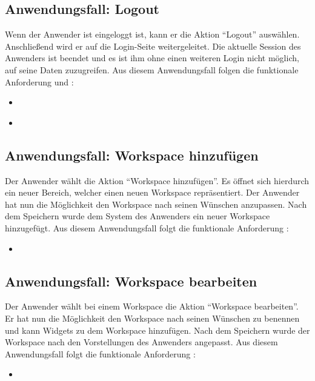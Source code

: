 \subsection{Anwendungsfall: Logout}
Wenn der Anwender ist eingeloggt ist, kann er die Aktion "`Logout"' auswählen. Anschließend wird er auf die Login-Seite weitergeleitet. Die aktuelle Session des Anwenders ist beendet und es ist ihm ohne einen weiteren Login nicht möglich, auf seine Daten zuzugreifen. Aus diesem Anwendungsfall folgen die funktionale Anforderung  und :
\begin{itemize}
 \item \requirementf{\requirementLogout}\label{requirementLogout}
 \item \requirementf{\requirementKeinZugriffNachLogout}\label{requirementKeinZugriffNachLogout}
\end{itemize}

\subsection{Anwendungsfall: Workspace hinzufügen}
Der Anwender wählt die Aktion "`Workspace hinzufügen"'. Es öffnet sich hierdurch ein neuer Bereich, welcher einen neuen Workspace repräsentiert. Der Anwender hat nun die Möglichkeit den Workspace nach seinen Wünschen anzupassen. Nach dem Speichern wurde dem System des Anwenders ein neuer Workspace hinzugefügt. Aus diesem Anwendungsfall folgt die funktionale Anforderung :
\begin{itemize}
 \item \requirementf{\requirementWorkspaceAdd}\label{requirementWorkspaceAdd}
\end{itemize}
 
\subsection{Anwendungsfall: Workspace bearbeiten}
Der Anwender wählt bei einem Workspace die Aktion "`Workspace bearbeiten"'. Er hat nun die Möglichkeit den Workspace nach seinen Wünschen zu benennen und kann Widgets zu dem Workspace hinzufügen. Nach dem Speichern wurde der Workspace nach den Vorstellungen des Anwenders angepasst. Aus diesem Anwendungsfall folgt die funktionale Anforderung :
\begin{itemize}
 \item \requirementf{\requirementWorkspaceEdit}\label{requirementWorkspaceEdit}
\end{itemize}
 
